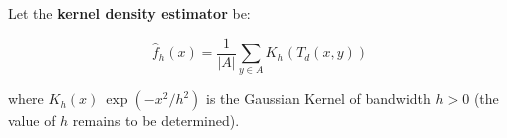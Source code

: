 Let the \textbf{ kernel density estimator} be:

\[   \hat{f}_h(x) = \frac{1}{|A|}\sum_{ y \in A} K_h (T_d(x,y))  \]

 where $K_h(x) ~ \exp( -x^2/h^2)$ is the Gaussian Kernel of bandwidth $h>0$ (the value of $h$ remains to be determined).


